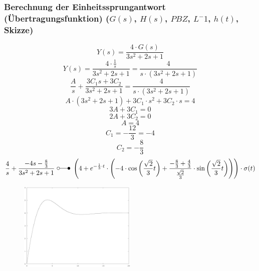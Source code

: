 \documentclass[a4paper,10pt,fleqn]{article}
\begin{document}
\subsubsection*{Berechnung der Einheitssprungantwort (Übertragungsfunktion) ($G(s)$, $H(s)$, $PBZ$, $L^-1$, $h(t)$, Skizze)}
\[ Y(s) = \frac{4 \cdot G(s)}{3 s^2 + 2 s + 1} \]
\[ Y(s) = \frac{4 \cdot \frac{1}{s}}{3 s^2 + 2 s + 1} = \frac{4}{s \cdot (3 s^2 + 2 s + 1)} \]
\[ \frac{A}{s} + \frac{3 C_1 s + 3 C_2}{3 s^2 + 2 s + 1} = \frac{4}{s \cdot (3 s^2 + 2 s + 1)} \]
\[ A \cdot (3 s^2 + 2 s + 1) + 3 C_1 \cdot s^2 + 3 C_2 \cdot s = 4 \]
\[ 3 A + 3 C_1 = 0 \]
\[ 2 A + 3 C_2 = 0 \]
\[ A = 4 \]
\[ C_1 = -\frac{12}{3} = -4 \]
\[ C_2 = -\frac{8}{3} \]
\[ \frac{4}{s} + \frac{- 4 s - \frac{8}{3}}{3 s^2 + 2 s + 1} ~ \laplace ~ 
\left(4 + e^{-\frac{1}{3} \cdot t} \cdot \left(- 4 \cdot \cos\left(\frac{\sqrt{2}}{3} t\right) + \frac{-\frac{8}{3} + \frac{4}{3}}{\frac{\sqrt{2}}{3}} \cdot \sin\left(\frac{\sqrt{2}}{3} t\right) \right)\right) \cdot \sigma(t) \]
\begin{figure}[h!]
    \centering
    \includegraphics[width=0.5\textwidth]{sprung.eps}
\end{figure}
\end{document}
